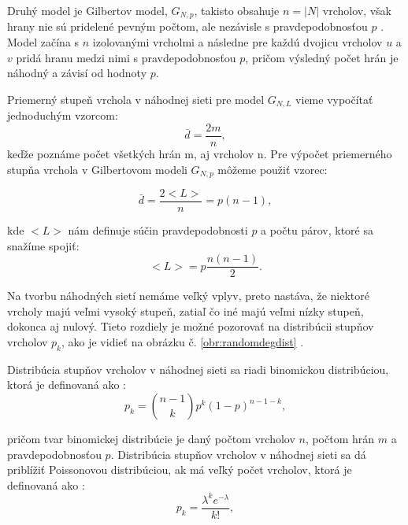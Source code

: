 Druhý model je Gilbertov model, $G_{N,p}$, takisto obsahuje $n = |N|$ vrcholov, však hrany nie sú pridelené pevným počtom,
ale nezávisle s pravdepodobnosťou $p$ \cite{gilbert1959random}\cite{barabasi2016network}. Model začína s $n$ izolovanými vrcholmi a následne pre každú dvojicu vrcholov
$u$ a $v$ pridá hranu medzi nimi s pravdepodobnosťou $p$, pričom výsledný počet hrán je náhodný a závisí od hodnoty $p$.

Priemerný stupeň vrchola v náhodnej sieti pre model $G_{N,L}$ vieme vypočítať jednoduchým vzorcom:
\begin{equation}
    \bar{d} = \frac{2m}{n},
    \label{eq:avg_degree_random}
\end{equation}
keďže poznáme počet všetkých hrán m, aj vrcholov n\cite{barabasi2016network}. Pre výpočet priemerného stupňa vrchola
v Gilbertovom modeli $G_{N,p}$ môžeme použiť vzorec\cite{barabasi2016network}:

\begin{equation}
    \bar{d} = \frac{2<L>}{n} = p(n-1),
    \label{eq:avg_degree_gilbert}
\end{equation}

kde $<L>$ nám definuje súčin pravdepodobnosti $p$ a počtu párov, ktoré sa snažíme spojiť\cite{barabasi2016network}:
\begin{equation}
    <L> = p\frac{n(n-1)}{2}.
    \label{eq:avg_edges_gilbert}
\end{equation}

Na tvorbu náhodných sietí nemáme veľký vplyv, preto nastáva, že niektoré vrcholy majú veľmi vysoký stupeň, 
zatiaľ čo iné majú veľmi nízky stupeň, dokonca aj nulový. Tieto rozdiely je možné pozorovať na distribúcii
stupňov vrcholov $p_k$, ako je vidieť na obrázku č. \ref{obr:randomdegdist} \cite{barabasi2016network}.

Distribúcia stupňov vrcholov v náhodnej sieti sa riadi binomickou distribúciou, ktorá je definovaná ako \cite{barabasi2016network}:
\begin{equation}
    p_k = \binom{n-1}{k} p^k (1-p)^{n-1-k},
    \label{eq:binomial_distribution}        
\end{equation}

pričom tvar binomickej distribúcie je daný počtom vrcholov $n$, počtom hrán $m$ a pravdepodobnosťou $p$.
Distribúcia stupňov vrcholov v náhodnej sieti sa dá priblížiť Poissonovou distribúciou, ak má veľký počet vrcholov,
ktorá je definovaná ako \cite{barabasi2016network}:
\begin{equation}
    p_k = \frac{\lambda^k e^{-\lambda}}{k!},
    \label{eq:poisson_distribution}
\end{equation}

